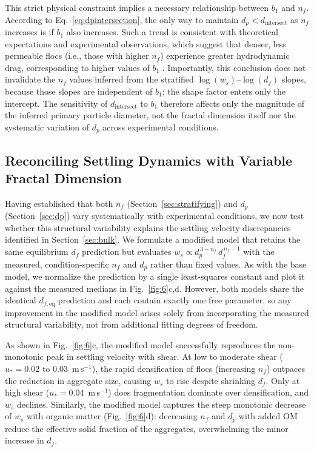 \documentclass{agujournal2019}
\begin{document}
This strict physical constraint implies a necessary relationship between $b_1$ and $n_f$. According to Eq.~\eqref{eq:dpintersection}, the only way to maintain $d_p < d_\text{intersect}$ as $n_f$ increases is if $b_1$ also increases. Such a trend is consistent with theoretical expectations and experimental observations, which suggest that denser, less permeable flocs (i.e., those with higher $n_f$) experience greater hydrodynamic drag, corresponding to higher values of $b_1$ \cite{strom2011explicit}. Importantly, this conclusion does not invalidate the $n_f$ values inferred from the stratified $\log(w_s)$--$\log(d_f)$ slopes, because those slopes are independent of $b_1$; the shape factor enters only the intercept. The sensitivity of $d_\text{intersect}$ to $b_1$ therefore affects only the magnitude of the inferred primary particle diameter, not the fractal dimension itself nor the systematic variation of $d_p$ across experimental conditions.

\subsection{Reconciling Settling Dynamics with Variable Fractal Dimension}
\label{sec:reconciling}

Having established that both $n_f$ (Section~\ref{sec:stratifying}) and $d_p$ (Section~\ref{sec:dp}) vary systematically with experimental conditions, we now test whether this structural variability explains the settling velocity discrepancies identified in Section~\ref{sec:bulk}. We formulate a modified model that retains the same equilibrium $d_f$ prediction but evaluates $w_s \propto d_p^{\,3-n_f}\, d_f^{\,n_f-1}$ with the measured, condition-specific $n_f$ and $d_p$ rather than fixed values. As with the base model, we normalize the prediction by a single least-squares constant and plot it against the measured medians in Fig.~\ref{fig:6}c,d. However, both models share the identical $d_{f,\text{eq}}$ prediction and each contain exactly one free parameter, so any improvement in the modified model arises solely from incorporating the measured structural variability, not from additional fitting degrees of freedom.

As shown in Fig.~\ref{fig:6}c, the modified model successfully reproduces the non-monotonic peak in settling velocity with shear. At low to moderate shear ($u_* = 0.02$ to $0.03$~m\,s$^{-1}$), the rapid densification of flocs (increasing $n_f$) outpaces the reduction in aggregate size, causing $w_s$ to rise despite shrinking $d_f$. Only at high shear ($u_* = 0.04$~m\,s$^{-1}$) does fragmentation dominate over densification, and $w_s$ declines. Similarly, the modified model captures the steep monotonic decrease of $w_s$ with organic matter (Fig.~\ref{fig:6}d): decreasing $n_f$ and $d_p$ with added OM reduce the effective solid fraction of the aggregates, overwhelming the minor increase in $d_f$.
\end{document}
